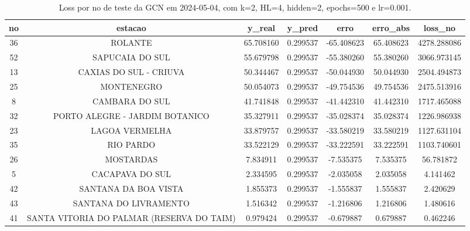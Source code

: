 \begin{table}[h]
\centering
\caption{Loss por no de teste da GCN em 2024-05-04, com k=2, HL=4, hidden=2, epochs=500 e lr=0.001.}
\label{tab:gcn_loss_k2_hl4_h2_e500_d20240504}
\begin{tabular}{ccccccc}
\toprule
no & estacao & y\_real & y\_pred & erro & erro\_abs & loss\_no \\
\midrule
36 & ROLANTE & 65.708160 & 0.299537 & -65.408623 & 65.408623 & 4278.288086 \\
52 & SAPUCAIA DO SUL & 55.679798 & 0.299537 & -55.380260 & 55.380260 & 3066.973145 \\
13 & CAXIAS DO SUL - CRIUVA & 50.344467 & 0.299537 & -50.044930 & 50.044930 & 2504.494873 \\
25 & MONTENEGRO & 50.054073 & 0.299537 & -49.754536 & 49.754536 & 2475.513916 \\
8 & CAMBARA DO SUL & 41.741848 & 0.299537 & -41.442310 & 41.442310 & 1717.465088 \\
32 & PORTO ALEGRE - JARDIM BOTANICO & 35.327911 & 0.299537 & -35.028374 & 35.028374 & 1226.986938 \\
23 & LAGOA VERMELHA & 33.879757 & 0.299537 & -33.580219 & 33.580219 & 1127.631104 \\
35 & RIO PARDO & 33.522129 & 0.299537 & -33.222591 & 33.222591 & 1103.740601 \\
26 & MOSTARDAS & 7.834911 & 0.299537 & -7.535375 & 7.535375 & 56.781872 \\
5 & CACAPAVA DO SUL & 2.334595 & 0.299537 & -2.035058 & 2.035058 & 4.141462 \\
42 & SANTANA DA BOA VISTA & 1.855373 & 0.299537 & -1.555837 & 1.555837 & 2.420629 \\
43 & SANTANA DO LIVRAMENTO & 1.516342 & 0.299537 & -1.216806 & 1.216806 & 1.480616 \\
41 & SANTA VITORIA DO PALMAR (RESERVA DO TAIM) & 0.979424 & 0.299537 & -0.679887 & 0.679887 & 0.462246 \\
\bottomrule
\end{tabular}
\end{table}
